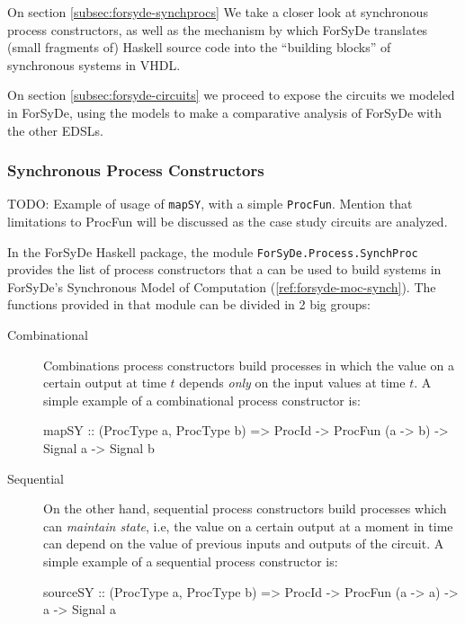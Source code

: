 \documentclass[a4paper]{article}
\begin{document}
                On section \ref{subsec:forsyde-synchprocs} We take a closer look at synchronous
                process constructors, as well as the mechanism by which ForSyDe translates (small
                fragments of) Haskell source code into the ``building blocks'' of synchronous
                systems in VHDL.

                On section \ref{subsec:forsyde-circuits} we proceed to expose the circuits we
                modeled in ForSyDe, using the models to make a comparative analysis of ForSyDe with
                the other EDSLs.

            \subsubsection{Synchronous Process Constructors}
            \label{subsubsec:forsyde-synchprocs}
                TODO: Example of usage of \texttt{mapSY}, with a simple \texttt{ProcFun}. Mention
                that limitations to ProcFun will be discussed as the case study circuits are
                analyzed.

                In the ForSyDe Haskell package, the module \texttt{ForSyDe.Process.SynchProc}
                provides the list of process constructors that a can be used to build systems in
                ForSyDe's Synchronous Model of Computation (\ref{ref:forsyde-moc-synch}). The
                functions provided in that module can be divided in 2 big groups:

                \begin{description}
                    \item[Combinational] Combinations process constructors build processes in which
                        the value on a certain output at time $t$ depends \emph{only} on the input
                        values at time $t$. A simple example of a combinational process constructor
                        is:
                        \begin{haskellcode}
        mapSY :: (ProcType a, ProcType b) => ProcId
              -> ProcFun (a -> b) -> Signal a -> Signal b
                        \end{haskellcode}

                    \item[Sequential] On the other hand, sequential process constructors build
                        processes which can \emph{maintain state}, i.e, the value on a certain output
                        at a moment in time can depend on the value of previous inputs and outputs
                        of the circuit. A simple example of a sequential process constructor is:
                        \begin{haskellcode}
        sourceSY :: (ProcType a, ProcType b) => ProcId
                 -> ProcFun (a -> a) -> a -> Signal a
                        \end{haskellcode}

                \end{description}
\end{document}
